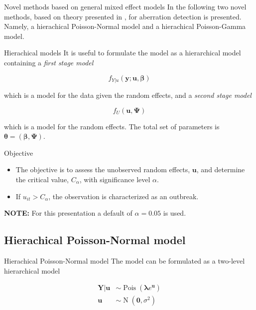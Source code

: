 \documentclass[aspectratio=169]{beamer}
\DeclareMathOperator{\N}{N}
\DeclareMathOperator{\Pois}{Pois}
\begin{document}
\begin{frame}{Novel methods based on general mixed effect models}
In the following two novel methods, based on theory presented in
\cite{Madsen_2010}, for aberration detection is presented. Namely, a
hierachical Poisson-Normal model and a hierachical Poisson-Gamma model.
\end{frame}

\begin{frame}{Hierachical models}
\protect\hypertarget{hierachical-models}{}
It is useful to formulate the model as a hierarchical model containing a
\textit{first stage model}

\begin{equation}
  f_{Y|u}(\boldsymbol{y};\boldsymbol{u},\boldsymbol{\beta})
\end{equation}

which is a model for the data given the random effects, and a
\textit{second stage model}

\begin{equation}
  f_U(\boldsymbol{u}, \boldsymbol{\Psi})
\end{equation}

which is a model for the random effects. The total set of parameters is
\(\boldsymbol{\theta}=(\boldsymbol{\beta}, \boldsymbol{\Psi})\).
\end{frame}

\begin{frame}{Objective}
\protect\hypertarget{objective}{}
\begin{itemize}
  \item The objective is to assess the unobserved random effects, $\boldsymbol{u}$, and determine the critical value, $C_\alpha$, with significance level $\alpha$.
  \item If $u_{it}>C_\alpha$, the observation is characterized as an outbreak.
\end{itemize}

\hfill\break
\hfill\break
\textbf{NOTE:} For this presentation a default of \(\alpha=0.05\) is
used.
\end{frame}

\hypertarget{hierachical-poisson-normal-model}{%
\subsection{Hierachical Poisson-Normal
model}\label{hierachical-poisson-normal-model}}

\begin{frame}{Hierachical Poisson-Normal model}
The model can be formulated as a two-level hierarchical model

\begin{subequations}
  \begin{alignat}{2}
    \boldsymbol{Y|u} &\sim \Pois (\boldsymbol{\lambda} e^{\boldsymbol{u}}) \label{eq:pois_ln0} \\
    \boldsymbol{u} &\sim \N (\boldsymbol{0}, \sigma^2) \label{eq:pois_ln1}
  \end{alignat}
\end{subequations}
\end{frame}
\end{document}

